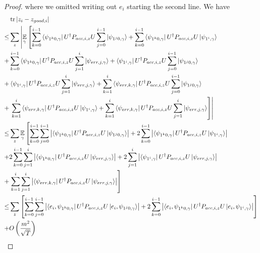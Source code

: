 \begin{proof}


 where we omitted writing out $e_i$ starting the second line. We have
\begin{align} \label{eq:zi-zgoodi}
    &\tr|z_i-z_{good,i}|   \nn \\
    \leq&  \sum_z  \L| \E_\gamma \L[\sum_{k=0}^{i-1} \bra{\psi_{1^k0,\gamma}}U^\dag  P_{acc,i,z}U   \sum_{j=0}^{i-1} \ket{\psi_{1^j0,\gamma}}+
    \sum_{k=0}^{i-1} \bra{\psi_{1^k0,\gamma}}U^\dag  P_{acc,i,z}U \ket{\psi_{1^i,\gamma}}  \R. \R. \nn \\
      +&  \sum_{k=0}^{i-1} \bra{\psi_{1^k0,\gamma}}U^\dag  P_{acc,i,z}U\sum_{j=1}^{i}\ket{\psi_{err,j,\gamma}}
    +\bra{\psi_{1^i,\gamma}} U^\dag  P_{acc,i,z}U \sum_{j=0}^{i-1} \ket{\psi_{1^j0,\gamma}}
    \nn \\
    +&  \bra{\psi_{1^i,\gamma}} U^\dag  P_{acc,i,z}U \sum_{j=1}^{i}\ket{\psi_{err,j,\gamma}}
    +\sum_{k=1}^{i}\bra{\psi_{err,k,\gamma}} U^\dag  P_{acc,i,z}U  \sum_{j=0}^{i-1} \ket{\psi_{1^j0,\gamma}}
     \nn \\
    +&\L.\L. \sum_{k=1}^{i}\bra{\psi_{err,k,\gamma}} U^\dag  P_{acc,i,z}U \ket{\psi_{1^i,\gamma}}
    +\sum_{k=1}^{i}\bra{\psi_{err,k,\gamma}} U^\dag  P_{acc,i,z}U \sum_{j=1}^{i}\ket{\psi_{err,j,\gamma}} \R]\R| \nn \\  %
    \leq&  \sum_z   \E_\gamma \L[\sum_{k=0}^{i-1} \sum_{j=0}^{i-1} \L| \bra{\psi_{1^k0,\gamma}}U^\dag  P_{acc,i,z}U    \ket{\psi_{1^j0,\gamma}} \R|+
    2 \sum_{k=0}^{i-1} \L|\bra{\psi_{1^k0,\gamma}}U^\dag  P_{acc,i,z}U \ket{\psi_{1^i,\gamma}} \R|  \R.  \nn \\
      +&  2 \sum_{k=0}^{i-1}\sum_{j=1}^{i}\L| \bra{\psi_{1^k0,\gamma}}U^\dag  P_{acc,i,z}U\ket{\psi_{err,j,\gamma}}\R|    
    +2 \sum_{j=1}^{i}\L|\bra{\psi_{1^i,\gamma}} U^\dag  P_{acc,i,z}U \ket{\psi_{err,j,\gamma}}\R| \nn \\
    +&\L. \sum_{k=1}^{i}\sum_{j=1}^{i}\L| \bra{\psi_{err,k,\gamma}} U^\dag  P_{acc,i,z}U \ket{\psi_{err,j,\gamma}}\R| \R] \nn \\ %
      \leq&  \sum_z   \L[\sum_{k=0}^{i-1} \sum_{j=0}^{i-1} \L| \bra{e_i,\psi_{1^k0,\gamma}}U^\dag  P_{acc,i,z}U    \ket{e_i,\psi_{1^j0,\gamma}} \R|+
    2 \sum_{k=0}^{i-1} \L|\bra{e_i,\psi_{1^k0,\gamma}}U^\dag  P_{acc,i,z}U \ket{e_i,\psi_{1^i,\gamma}} \R|  \R]\nn \\
    +& O\L(\frac{m^2}{\sqrt T}\R)\nn \\ %

\end{align}
\end{proof}

